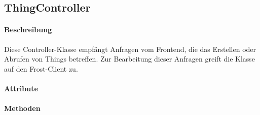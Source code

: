 \subsection{ThingController}

\paragraph{Beschreibung}
Diese Controller-Klasse empfängt Anfragen vom Frontend, die das Erstellen oder Abrufen von Things betreffen. Zur Bearbeitung dieser Anfragen greift die Klasse auf den Frost-Client zu.


\paragraph{Attribute}


\paragraph{Methoden}
